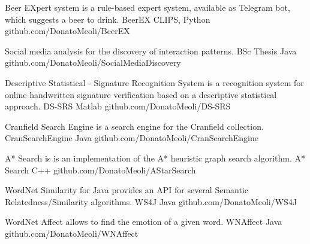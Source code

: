 

\begin{cventries}

  \cventry
    {Beer EXpert system is a rule-based expert system, available as Telegram bot, which suggests a beer to drink.} %
    {BeerEX} %
    {CLIPS, Python} %
    {github.com/DonatoMeoli/BeerEX} %
    {}

  \cventry
    {Social media analysis for the discovery of interaction patterns.} %
    {BSc Thesis} %
    {Java} %
    {github.com/DonatoMeoli/SocialMediaDiscovery} %
    {}

  \cventry
    {Descriptive Statistical - Signature Recognition System is a recognition system for online handwritten signature verification based on a descriptive statistical approach.} %
    {DS-SRS} %
    {Matlab} %
    {github.com/DonatoMeoli/DS-SRS} %
    {}

  \cventry
    {Cranfield Search Engine is a search engine for the Cranfield collection.} %
    {CranSearchEngine} %
    {Java} %
    {github.com/DonatoMeoli/CranSearchEngine} %
    {}

  \cventry
    {A* Search is  is an implementation of the A* heuristic graph search algorithm.} %
    {A* Search} %
    {C++} %
    {github.com/DonatoMeoli/AStarSearch} %
    {}

  \cventry
    {WordNet Similarity for Java provides an API for several Semantic Relatedness/Similarity algorithms.} %
    {WS4J} %
    {Java} %
    {github.com/DonatoMeoli/WS4J} %
    {}

  \cventry
    {WordNet Affect allows to find the emotion of a given word.} %
    {WNAffect} %
    {Java} %
    {github.com/DonatoMeoli/WNAffect} %
    {}

\end{cventries}
